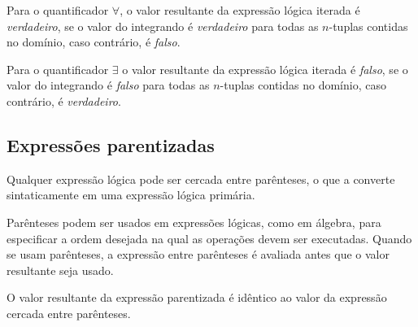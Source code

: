 \documentclass[11pt, brazil]{report}
\begin{document}
Para o quantificador $\forall$, o valor resultante da expressão
lógica iterada é {\it verdadeiro}, se o valor do integrando é
{\it verdadeiro} para todas as $n$-tuplas contidas no domínio,
caso contrário, é {\it falso}.

Para o quantificador $\exists$ o valor resultante da expressão
lógica iterada é {\it falso}, se o valor do integrando é
{\it falso} para todas as $n$-tuplas contidas no domínio,
caso contrário, é {\it verdadeiro}.

%
%

\subsection{Expressões parentizadas}

Qualquer expressão lógica pode ser cercada entre parênteses, o que a
converte sintaticamente em uma expressão lógica primária.

Parênteses podem ser usados em expressões lógicas, como em álgebra, para
especificar a ordem desejada na qual as operações devem ser executadas.
Quando se usam parênteses, a expressão entre parênteses é avaliada antes
que o valor resultante seja usado.

O valor resultante da expressão parentizada é idêntico ao valor da expressão
cercada entre parênteses.

%
%
\end{document}
